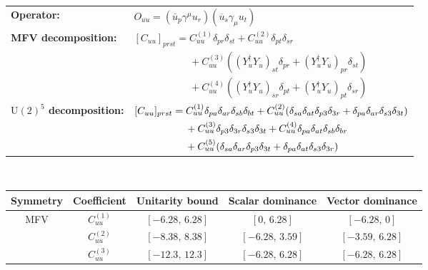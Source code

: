 \begin{table}[tbp]
\centering
{\small
\begin{tabular}{ll}
    \textbf{Operator:} &
        $\boxed{O_{uu} = (\overline u_p \gamma^\mu u_r)(\overline u_s \gamma_\mu u_t)}$ \\[0.2cm]
    \textbf{MFV decomposition:} &
        $[C_{uu}]_{prst} =
            C_{uu}^{(1)}\delta_{pr}\delta_{st}
            + C_{uu}^{(2)}\delta_{pt}\delta_{sr}
            $ \\
        & $\phantom{[C_{uu}]_{prst} ={}}+ C_{uu}^{(3)}((Y_u^\dagger Y_u)_{st}\delta_{pr} + (Y_u^\dagger Y_u)_{pr}\delta_{st})$ \\
        & $\phantom{[C_{uu}]_{prst} ={}}
            + C_{uu}^{(4)}((Y_u^\dagger Y_u)_{sr}\delta_{pt} + (Y_u^\dagger Y_u)_{pt}\delta_{sr})$ \\[0.15cm]
    \textbf{$\mathrm{U}(2)^5$ decomposition:} &
        $[C_{uu}]_{prst} =
            C_{uu}^{(1)}\Pij{p}{r}{a}\Pij{s}{t}{b}
            + C_{uu}^{(2)}(\Pij{s}{t}{a}\delta_{p3}\delta_{3r} + \Pij{p}{r}{a}\delta_{s3}\delta_{3t})
            $ \\
        & $\phantom{[C_{uu}]_{prst} ={}}+ C_{uu}^{(3)}\delta_{p3}\delta_{3r}\delta_{s3}\delta_{3t}
            + C_{uu}^{(4)}\Pij{p}{t}{a}\Pij{s}{r}{b}
            $ \\
        & $\phantom{[C_{uu}]_{prst} ={}}+ C_{uu}^{(5)}(\Pij{s}{r}{a}\delta_{p3}\delta_{3t} + \Pij{p}{t}{a}\delta_{s3}\delta_{3r})$ \\
\end{tabular}
\\[0.3cm]
\renewcommand{\arraystretch}{1.3}
\begin{tabular}{ccccc}
    \toprule
    \rowcolor{hdrcolor}
    \textbf{Symmetry} & \textbf{Coefficient}
        & \textbf{Unitarity bound}
        & \textbf{Scalar dominance}
        & \textbf{Vector dominance} \\
    \midrule
    \multirow{4}{*}{MFV}
        & $C_{uu}^{(1)}$ & $[-6.28,\, 6.28]$  & $[0,\, 6.28]$      & $[-6.28,\, 0]$    \\
        & $C_{uu}^{(2)}$ & $[-8.38,\, 8.38]$  & $[-6.28,\, 3.59]$  & $[-3.59,\, 6.28]$ \\
        & $C_{uu}^{(3)}$ & $[-12.3,\, 12.3]$  & $[-6.28,\, 6.28]$  & $[-6.28,\, 6.28]$ \\

\end{tabular}}
\end{table}
